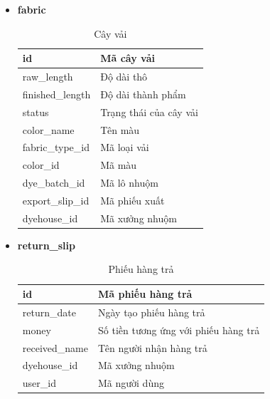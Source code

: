 \begin{itemize}
    \newpage
    \item \textbf{fabric}
    \begin{table}[H]
        \centering
        \begin{tabular}{|m{3cm}|m{10cm}|}
        \hline 
            id & Mã cây vải\\ \hline
            raw\_length & Độ dài thô\\ \hline
            finished\_length & Độ dài thành phẩm \\ \hline
            status & Trạng thái của cây vải\\ \hline
            color\_name & Tên màu\\ \hline
            fabric\_type\_id & Mã loại vải\\ \hline
            color\_id & Mã màu \\ \hline
            dye\_batch\_id & Mã lô nhuộm\\ \hline
            export\_slip\_id & Mã phiếu xuất\\ \hline
            dyehouse\_id & Mã xưởng nhuộm\\ 
        \hline 
        \end{tabular}
        \caption{Cây vải}
        \label{fabric}
    \end{table}

    \item \textbf{return\_slip}
    \begin{table}[H]
        \centering
        \begin{tabular}{|m{3cm}|m{10cm}|}
        \hline 
            id & Mã phiếu hàng trả\\ \hline
            return\_date & Ngày tạo phiếu hàng trả\\ \hline
            money & Số tiền tương ứng với phiếu hàng trả \\ \hline
            received\_name & Tên người nhận hàng trả\\ \hline
            dyehouse\_id & Mã xưởng nhuộm\\ \hline
            user\_id & Mã người dùng\\ 
        \hline 
        \end{tabular}
        \caption{Phiếu hàng trả}
        \label{return_slip}
    \end{table}
    

\end{itemize}
